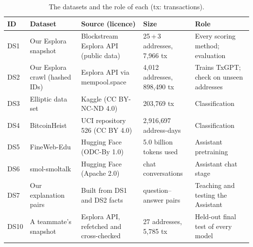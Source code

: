 \begin{table}[htbp]
\centering
\footnotesize
\caption{The datasets and the role of each (tx: transactions).}
\label{tab:datasets}
\begin{tabularx}{\textwidth}{@{}l L{3.0cm} L{3.7cm} L{3.0cm} Y@{}}
\toprule
ID & Dataset & Source (licence) & Size & Role \\
\midrule
DS1 & Our Esplora snapshot & Blockstream Esplora API (public data) & 25\,+\,3 addresses, 7{,}966 tx & Every scoring method; evaluation \\
DS2 & Our Esplora crawl (hashed IDs) & Esplora API via mempool.space & 4{,}012 addresses, 898{,}490 tx & Trains TxGPT; check on unseen addresses \\
DS3 & Elliptic data set & Kaggle (CC BY-NC-ND 4.0) & 203{,}769 tx & Classification \\
DS4 & BitcoinHeist & UCI repository 526 (CC BY 4.0) & 2{,}916{,}697 address-days & Classification \\
DS5 & FineWeb-Edu & Hugging Face (ODC-By 1.0) & 5.0 billion tokens used & Assistant pretraining \\
DS6 & smol-smoltalk & Hugging Face (Apache 2.0) & chat conversations & Assistant chat stage \\
DS7 & Our explanation pairs & Built from DS1 and DS2 facts & question--answer pairs & Teaching and testing the Assistant \\
DS10 & A teammate's snapshot & Esplora API, refetched and cross-checked & 27 addresses, 5{,}785 tx & Held-out final test of every model \\
\bottomrule
\end{tabularx}
\end{table}
